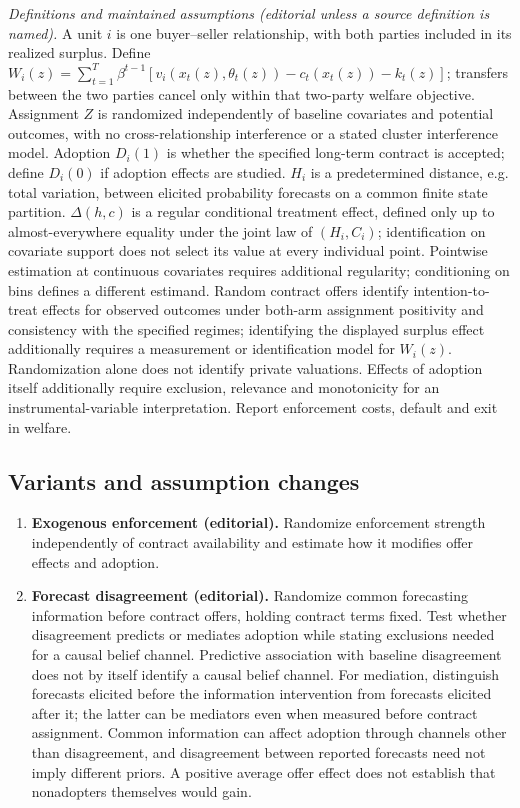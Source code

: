 \documentclass[11pt,a4paper]{article}
\begin{document}
\emph{Definitions and maintained assumptions (editorial unless a source definition is named).} A unit \(i\) is one buyer--seller relationship, with both parties included in its realized surplus. Define \(W_i(z)=\sum_{t=1}^T\beta^{t-1}[v_i(x_t(z),\theta_t(z))-c_t(x_t(z))-k_t(z)]\); transfers between the two parties cancel only within that two-party welfare objective. Assignment \(Z\) is randomized independently of baseline covariates and potential outcomes, with no cross-relationship interference or a stated cluster interference model. Adoption \(D_i(1)\) is whether the specified long-term contract is accepted; define \(D_i(0)\) if adoption effects are studied. \(H_i\) is a predetermined distance, e.g. total variation, between elicited probability forecasts on a common finite state partition. \(\Delta(h,c)\) is a regular conditional treatment effect, defined only up to almost-everywhere equality under the joint law of \((H_i,C_i)\); identification on covariate support does not select its value at every individual point. Pointwise estimation at continuous covariates requires additional regularity; conditioning on bins defines a different estimand. Random contract offers identify intention-to-treat effects for observed outcomes under both-arm assignment positivity and consistency with the specified regimes; identifying the displayed surplus effect additionally requires a measurement or identification model for \(W_i(z)\). Randomization alone does not identify private valuations. Effects of adoption itself additionally require exclusion, relevance and monotonicity for an instrumental-variable interpretation. Report enforcement costs, default and exit in welfare.
\subsection*{Variants and assumption changes}
\begin{enumerate}
\item \textbf{Exogenous enforcement (editorial).} Randomize enforcement strength independently of contract availability and estimate how it modifies offer effects and adoption.
\item \textbf{Forecast disagreement (editorial).} Randomize common forecasting information before contract offers, holding contract terms fixed. Test whether disagreement predicts or mediates adoption while stating exclusions needed for a causal belief channel. Predictive association with baseline disagreement does not by itself identify a causal belief channel. For mediation, distinguish forecasts elicited before the information intervention from forecasts elicited after it; the latter can be mediators even when measured before contract assignment. Common information can affect adoption through channels other than disagreement, and disagreement between reported forecasts need not imply different priors. A positive average offer effect does not establish that nonadopters themselves would gain.
\end{enumerate}
\end{document}
